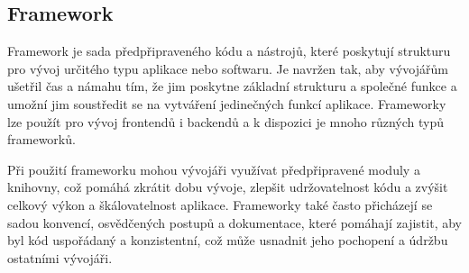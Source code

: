 \subsection{Framework}
Framework je sada předpřipraveného kódu a nástrojů, které poskytují strukturu pro vývoj určitého typu aplikace nebo softwaru. Je navržen tak, aby vývojářům ušetřil čas a námahu tím, že jim poskytne základní strukturu a společné funkce a umožní jim soustředit se na vytváření jedinečných funkcí aplikace. Frameworky lze použít pro vývoj frontendů i backendů a k dispozici je mnoho různých typů frameworků. \par 
Při použití frameworku mohou vývojáři využívat předpřipravené moduly a knihovny, což pomáhá zkrátit dobu vývoje, zlepšit udržovatelnost kódu a zvýšit celkový výkon a škálovatelnost aplikace. Frameworky také často přicházejí se sadou konvencí, osvědčených postupů a dokumentace, které pomáhají zajistit, aby byl kód uspořádaný a konzistentní, což může usnadnit jeho pochopení a údržbu ostatními vývojáři.